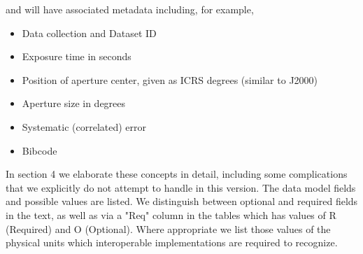 \documentclass[11pt]{article}
\begin{document}
\vskip 0.1in

and will have associated metadata including, for example,

\vskip 0.1in

\colorbox{ipink}{
\begin{minipage}{0.9\textwidth}
\begin{itemize}
\item Data collection and Dataset ID
\item Exposure time in seconds
\item Position of aperture center, given as ICRS degrees
(similar to J2000)
\item Aperture size in degrees
\item Systematic (correlated) error
\item Bibcode
\end{itemize}
\end{minipage}
}

\vskip 0.1in

In section 4 we elaborate these concepts in detail, including some
complications that we explicitly do not attempt to handle in this
version.
The data model fields and possible values
are listed. We distinguish between optional and required fields in the
text, as well as via a 
"Req" column in the tables which has values of R (Required) and O (Optional).
Where appropriate we list those values of the physical units which interoperable
implementations are required to recognize.
\end{document}

